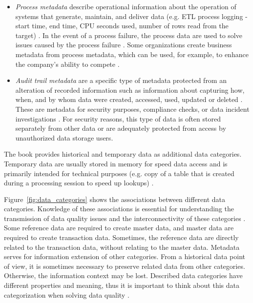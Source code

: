 \begin{itemize}
\begin{itemize}
						\item \emph{Process metadata} describe operational information about the operation of systems that generate, maintain, and deliver data (e.g. ETL process logging - start time, end time, CPU seconds used, number of rows read from the target) \cite{Mahanti2018}. In the event of a process failure, the process data are used to solve issues caused by the process failure \cite{Mahanti2018}. Some organizations create business metadata from process metadata, which can be used, for example, to enhance the company's ability to compete \cite{Mahanti2018}.
						\item \emph{Audit trail metadata} are a specific type of metadata protected from an alteration of recorded information such as information about capturing how, when, and by whom data were created, accessed, used, updated or deleted  \cite{McGilvray2008}. These are metadata for security purposes, compliance checks, or data incident investigations \cite{Mahanti2018}. For security reasons, this type of data is often stored separately from other data \cite{Mahanti2018} or are adequately protected from access by unauthorized data storage users.
					\end{itemize}
				\end{itemize}


				The book \cite{McGilvray2008} provides historical and temporary data as additional data categories. Temporary data are usually stored in memory for speed data access and is primarily intended for technical purposes (e.g. copy of a table that is created during a processing session to speed up lookups) \cite{McGilvray2008}.	
				
				Figure~\ref{fig:data_categories} shows the associations between different data categories. Knowledge of these associations is essential for understanding the transmission of data quality issues and the interconnectivity of these categories \cite{McGilvray2008}. Some reference data are required to create master data, and master data are required to create transaction data. Sometimes, the reference data are directly related to the transaction data, without relating to the master data. Metadata serves for information extension of other categories. From a historical data point of view, it is sometimes necessary to preserve related data from other categories. Otherwise, the information context may be lost. Described data categories have different properties and meaning, thus it is important to think about this data categorization when solving data quality \cite{McGilvray2008}.			
	
